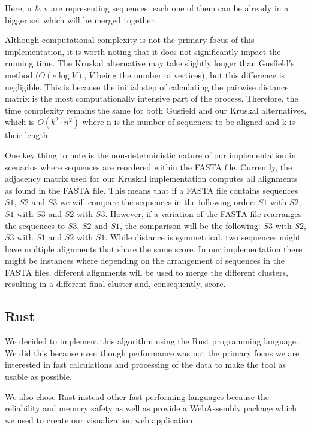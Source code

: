 \documentclass[twoside,openright,titlepage,numbers=noenddot,headinclude,%
                footinclude=true,cleardoublepage=empty,abstractoff, %
                BCOR=5mm,paper=a4,fontsize=11pt,%
                ngerman,american,%
                ]{scrreprt}
\begin{document}
Here, u \& v are representing sequences, each one of them can be already in a bigger set which will be merged together.

Although computational complexity is not the primary focus of this implementation, it is worth noting that it does not significantly impact the running time. The Kruskal alternative may take slightly longer than Gusfield's method ($O(e \log V)$, $V$ being the number of vertices), but this difference is negligible. This is because the initial step of calculating the pairwise distance matrix is the most computationally intensive part of the process. Therefore, the time complexity remains the same for both Gusfield and our Kruskal alternatives, which is  \(O(k^2 \cdot n^2)\) where n is the number of sequences to be aligned and k is their length.

One key thing to note is the non-deterministic nature of our implementation in scenarios where sequences are reordered within the FASTA file. Currently, the adjacency matrix used for our Kruskal implementation computes all alignments as found in the FASTA file. This means that if a FASTA file contains sequences $S1$, $S2$ and $S3$ we will compare the sequences in the following order: $S1$ with $S2$, $S1$ with $S3$ and $S2$ with $S3$. However, if a variation of the FASTA file rearranges the sequences to $S3$, $S2$ and $S1$, the comparison will be the following: $S3$ with $S2$, $S3$ with $S1$ and $S2$ with $S1$. While distance is symmetrical, two sequences might have multiple alignments that share the same score. In our implementation there might be instances where depending on the arrangement of sequences in the FASTA files, different alignments will be used to merge the different clusters, resulting in a different final cluster and, consequently, score.

\subsection{Rust}

We decided to implement this algorithm using the Rust programming language. We did this because even though performance was not the primary focus we are interested in fast calculations and processing of the data to make the tool as usable as possible.

We also chose Rust instead other fast-performing languages because the reliability and memory safety as well as provide a WebAssembly package which we used to create our visualization web application. 
\end{document}
